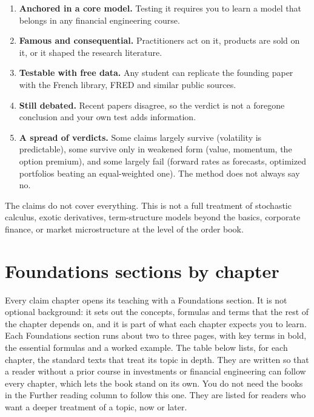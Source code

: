 \begin{enumerate}
  \item \textbf{Anchored in a core model.} Testing it requires you to learn a model that belongs in any financial engineering course.
  \item \textbf{Famous and consequential.} Practitioners act on it, products are sold on it, or it shaped the research literature.
  \item \textbf{Testable with free data.} Any student can replicate the founding paper with the French library, FRED and similar public sources.
  \item \textbf{Still debated.} Recent papers disagree, so the verdict is not a foregone conclusion and your own test adds information.
  \item \textbf{A spread of verdicts.} Some claims largely survive (volatility is predictable), some survive only in weakened form (value, momentum, the option premium), and some largely fail (forward rates as forecasts, optimized portfolios beating an equal-weighted one). The method does not always say no.
\end{enumerate}

The claims do not cover everything. This is not a full treatment of stochastic calculus, exotic derivatives, term-structure models beyond the basics, corporate finance, or market microstructure at the level of the order book. 

\section*{Foundations sections by chapter}

Every claim chapter opens its teaching with a Foundations section. It is not optional background: it sets out the concepts, formulas and terms that the rest of the chapter depends on, and it is part of what each chapter expects you to learn. Each Foundations section runs about two to three pages, with key terms in bold, the essential formulas and a worked example. The table below lists, for each chapter, the standard texts that treat its topic in depth. They are written so that a reader without a prior course in investments or financial engineering can follow every chapter, which lets the book stand on its own. You do not need the books in the Further reading column to follow this one. They are listed for readers who want a deeper treatment of a topic, now or later.

